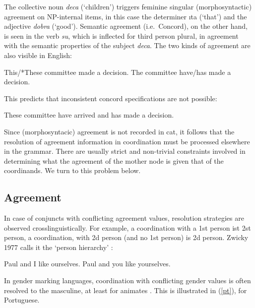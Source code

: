 \documentclass[output=paper]{langsci/langscibook}
\begin{document}
\noindent
The collective noun {\it deca} (`children') triggers feminine singular (morphosyntactic) agreement on NP-internal items, in this case the determiner {\i ta} (`that') and the adjective {\it dobra} (`good').  Semantic agreement (i.e.\ Concord), on the other hand, is seen in the verb {\it su}, which  is inflected for third person plural, in agreement with the semantic properties of the subject {\it deca}. The two kinds of agreement are also visible in
English:

\begin{exe}
\ex
\begin{xlista}
\ex This/*These committee made a decision.
\ex The committee have/has made a decision.
\end{xlista}
\end{exe}

\noindent
This predicts that inconsistent  {\sc concord} specifications are not possible:

\begin{exe}
\ex{*} These committee  have arrived and has made a decision.
\end{exe}

\noindent
Since (morphosyntacic) agreement is not recorded in {\sc cat}, it follows that the resolution of agreement information in coordination must be processed elsewhere in the grammar. There are usually strict and non-trivial constraints involved in determining what the agreement of the mother node is given that of the coordinands. We turn to this problem below.







\subsection{Agreement}


In case of conjuncts with conflicting agreement values, resolution strategies are observed crosslinguistically. For example, a coordination with a 1st person ist 2st person, a coordination, with 2d person (and no 1st person) is 2d person. Zwicky 1977 calls it the ‘person hierarchy’ :

\begin{exe}
 \ex
\begin{xlista}
\ex Paul and I like ourselves.
\ex Paul and you like yourselves.
\end{xlista}
\end{exe}

In gender marking languages, coordination with conflicting gender values is often resolved to the masculine, at least for animates \citep{Corbet91}. This is illustrated in (\ref{pt}), for Portuguese.
\end{document}
